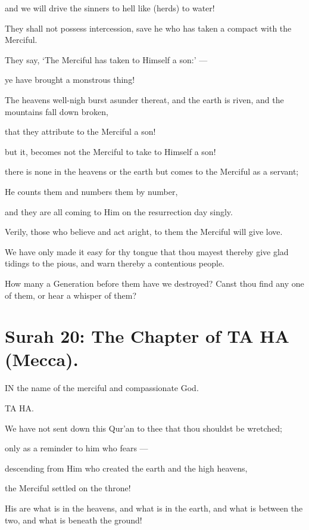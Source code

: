 \documentclass[fontsize=14pt, letterpaper, notitlepage, openany, DIV=12]{scrbook} %
\begin{document}
\noindent[19:86]
and we will drive the sinners to hell like (herds) to water!

\noindent[19:87]
They shall not possess intercession, save he who has taken a compact with the Merciful.

\noindent[19:88]
They say, `The Merciful has taken to Himself a son:' ---

\noindent[19:89]
ye have brought a monstrous thing!

\noindent[19:90]
The heavens well-nigh burst asunder thereat, and the earth is riven, and the mountains fall
down broken,

\noindent[19:91]
that they attribute to the Merciful a son!

\noindent[19:92]
but it, becomes not the Merciful to take to Himself a son!

\noindent[19:93]
there is none in the heavens or the earth but comes to the Merciful as a servant;

\noindent[19:94]
He counts them and numbers them by number,

\noindent[19:95]
and they are all coming to Him on the resurrection day singly.

\noindent[19:96]
Verily, those who believe and act aright, to them the Merciful will give love.

\noindent[19:97]
We have only made it easy for thy tongue that thou mayest thereby give glad tidings to
the pious, and warn thereby a contentious people.

\noindent[19:98]
How many a Generation before them have we destroyed? Canst thou find any one of
them, or hear a whisper of them?


\section{Surah 20: The Chapter of TA HA (Mecca).}


IN the name of the merciful and compassionate God.

\noindent[20:1]
TA HA.

\noindent[20:2]
We have not sent down this Qur'an to thee that thou shouldst be wretched;

\noindent[20:3]
only as a reminder to him who fears ---

\noindent[20:4]
descending from Him who created the earth and the high heavens,

\noindent[20:5]
the Merciful settled on the throne!

\noindent[20:6]
His are what is in the heavens, and what is in the earth, and what is between the two, and
what is beneath the ground!
\end{document}

